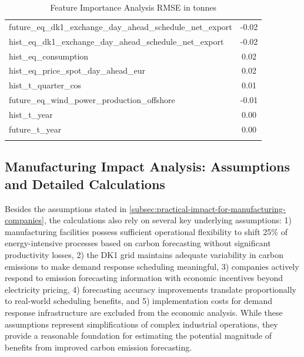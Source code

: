 \begin{xltabular}{\textwidth}{Xc}
    future\_eq\_dk1\_exchange\_day\_ahead\_schedule\_net\_export & -0.02               \\
    hist\_eq\_dk1\_exchange\_day\_ahead\_schedule\_net\_export   & -0.02               \\
    hist\_eq\_consumption                                        & 0.02                \\
    hist\_eq\_price\_spot\_day\_ahead\_eur                       & 0.02                \\
    hist\_t\_quarter\_cos                                        & 0.01                \\
    future\_eq\_wind\_power\_production\_offshore                & -0.01               \\
    hist\_t\_year                                                & 0.00                \\
    future\_t\_year                                              & 0.00                \\ \hline
    \caption{Feature Importance Analysis RMSE in tonnes \cotwoe{}}
    \label{tab:feature-importance-analysis-rmse}
\end{xltabular}

\clearpage

\thispagestyle{plain}
\subsection{Manufacturing Impact Analysis: Assumptions and Detailed Calculations}
\label{apdx:manufacturing-impact-analysis}

Besides the assumptions stated in \autoref{subsec:practical-impact-for-manufacturing-companies}, the calculations also rely on several key underlying assumptions: 1) manufacturing facilities possess sufficient operational flexibility to shift 25\% of energy-intensive processes based on carbon forecasting without significant productivity losses, 2) the DK1 grid maintains adequate variability in carbon emissions to make demand response scheduling meaningful, 3) companies actively respond to emission forecasting information with economic incentives beyond electricity pricing, 4) forecasting accuracy improvements translate proportionally to real-world scheduling benefits, and 5) implementation costs for demand response infrastructure are excluded from the economic analysis. While these assumptions represent simplifications of complex industrial operations, they provide a reasonable foundation for estimating the potential magnitude of benefits from improved carbon emission forecasting.

